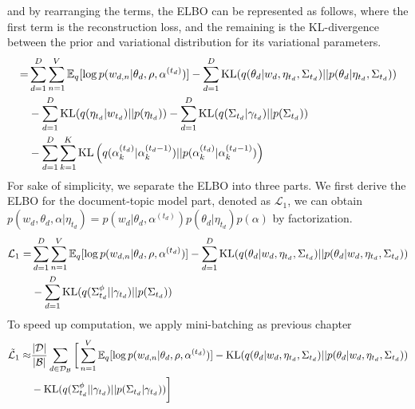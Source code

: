 and by rearranging the terms, the ELBO can be represented as follows, where the first term is the reconstruction loss, and the remaining is the KL-divergence between the prior and variational distribution for its variational parameters.
\begin{align}\label{eq:ch5_elbo1}
=&\sum_{d=1}^{D}\sum_{n=1}^{V}\mathbb{E}_q[\log p(w_{d,n}|\theta_d,\rho,\alpha^{(t_d)})]-\sum_{d=1}^{D}\text{KL}(q(\theta_d|w_d,\eta_{t_d},\Sigma_{t_d})||p(\theta_d|\eta_{t_d},\Sigma_{t_d}))\notag\\
&-\sum_{d=1}^{D}\text{KL}(q(\eta_{t_d}|w_{t_d})||p(\eta_{t_d}))-\sum_{d=1}^{D}\text{KL}(q(\Sigma_{t_d}|\gamma_{t_d})||p(\Sigma_{t_d}))\notag\\
&-\sum_{d=1}^{D}\sum_{k=1}^{K}\text{KL}\left(q(\alpha_{k}^{(t_d)}|\alpha_{k}^{(t_d-1)})||p(\alpha_{k}^{(t_d)}|\alpha_{k}^{(t_d-1)})\right)
\end{align}
For sake of simplicity, we separate the ELBO into three parts. We first derive the ELBO for the document-topic model part, denoted as $ \mathcal{L}_{1} $, we can obtain $ p(w_d,\theta_d,\alpha|\eta_{t_d})=p(w_d|\theta_d,\alpha^{(t_d)})p(\theta_{d}|\eta_{t_d})p(\alpha)$ by factorization. 
\begin{align}\label{eq:ch5_elbo_p1}
\mathcal{L}_{1}=&\sum_{d=1}^{D}\sum_{n=1}^{V}\mathbb{E}_q[\log p(w_{d,n}|\theta_d,\rho,\alpha^{(t_d)})]-\sum_{d=1}^{D}\text{KL}(q(\theta_d|w_d,\eta_{t_d},\Sigma_{t_d})||p(\theta_d|w_d,\eta_{t_d},\Sigma_{t_d}))\notag\\
&-\sum_{d=1}^{D}\text{KL}(q(\Sigma^\phi_{t_d}||\gamma_{t_d})||p(\Sigma_{t_d}))
\end{align}
To speed up computation, we apply mini-batching as previous chapter
\begin{align}
\tilde{\mathcal{L}}_{1}\approx&\frac{|\mathcal{D}|}{|\mathcal{B}|}\sum_{d\in\mathcal{D}_{\mathcal{B}}}\bigg[\sum_{n=1}^{V}\mathbb{E}_q[\log p(w_{d,n}|\theta_d,\rho,\alpha^{(t_d)})]-\text{KL}(q(\theta_d|w_d,\eta_{t_d},\Sigma_{t_d})||p(\theta_d|w_d,\eta_{t_d},\Sigma_{t_d}))\notag\\
&-\text{KL}(q(\Sigma^\phi_{t_d}||\gamma_{t_d})||p(\Sigma_{t_d}|\gamma_{t_d}))\bigg]
\end{align}
